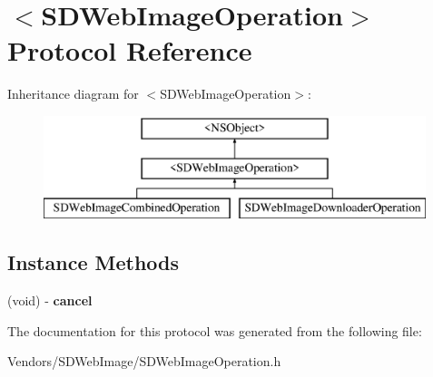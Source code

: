 \hypertarget{protocol_s_d_web_image_operation-p}{}\section{$<$S\+D\+Web\+Image\+Operation$>$ Protocol Reference}
\label{protocol_s_d_web_image_operation-p}
Inheritance diagram for $<$S\+D\+Web\+Image\+Operation$>$\+:\begin{figure}[H]
\begin{center}
\leavevmode
\includegraphics[height=3.000000cm]{protocol_s_d_web_image_operation-p}
\end{center}
\end{figure}
\subsection*{Instance Methods}
\begin{DoxyCompactItemize}
\item 
\hypertarget{protocol_s_d_web_image_operation-p_a98ded7ae5ff534f5fd532b8c255f0271}{}(void) -\/ {\bfseries cancel}\label{protocol_s_d_web_image_operation-p_a98ded7ae5ff534f5fd532b8c255f0271}

\end{DoxyCompactItemize}


The documentation for this protocol was generated from the following file\+:\begin{DoxyCompactItemize}
\item 
Vendors/\+S\+D\+Web\+Image/S\+D\+Web\+Image\+Operation.\+h\end{DoxyCompactItemize}
